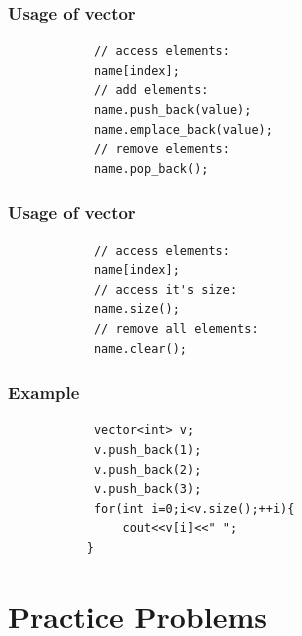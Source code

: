 \documentclass[xcolor=dvipsnames]{beamer}
\begin{document}
    \begin{frame}[fragile]
        \frametitle{Usage of vector}
        \begin{verbatim}
            // access elements:
            name[index];
            // add elements:
            name.push_back(value);
            name.emplace_back(value);
            // remove elements:
            name.pop_back();
        \end{verbatim}
    \end{frame}

    \begin{frame}[fragile]
        \frametitle{Usage of vector}
        \begin{verbatim}
            // access elements:
            name[index];
            // access it's size:
            name.size();
            // remove all elements:
            name.clear();
        \end{verbatim}
    \end{frame}

    \begin{frame}[fragile]
        \frametitle{Example}
        \begin{verbatim}
            vector<int> v;
            v.push_back(1);
            v.push_back(2);
            v.push_back(3);
            for(int i=0;i<v.size();++i){
                cout<<v[i]<<" ";
           }
        \end{verbatim}
    \end{frame}

    \section{Practice Problems}
\end{document}
